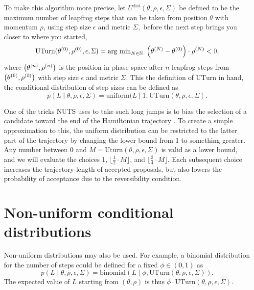 \documentclass[ejs]{imsart}
\theoremstyle{plain}%
\theoremstyle{remark}
\begin{document}
To make this algorithm more precise, let $U^{\textrm{dist}}(\theta, \rho, \epsilon, \Sigma)$ be defined to be the maximum number of leapfrog steps that can be taken from position $\theta$ with momentum $\rho$, using step size $\epsilon$ and metric $\Sigma,$ before the next step brings you closer to where you started,
\begin{equation}
\textrm{UTurn}(\pos{\theta}{0}, \pos{\rho}{0}, \epsilon, \Sigma)
= \textrm{arg min}_{N \in \mathbb{N}} \ \left(\pos{\theta}{N} - \pos{\theta}{0}\right) \cdot \pos{\rho}{N} < 0,
\end{equation}
where $\left(\theta^{(n)}, \rho^{(n)}\right)$ is the position in phase space after $n$ leapfrog steps from $\left(\theta^{(0)}, \rho^{(0)}\right)$ with step size $\epsilon$ and metric $\Sigma.$  This the definition of $\textrm{UTurn}$ in hand, the conditional distribution of step sizes can be defined as
\begin{equation}
p(L \mid \theta, \rho, \epsilon, \Sigma)
= \textrm{uniform}(L \mid 1, \textrm{UTurn}(\theta, \rho, \epsilon, \Sigma).
\end{equation}

One of the tricks NUTS uses to take such long jumps is to bias the selection of a candidate toward the end of the Hamiltonian trajectory \cite{HoGe2014}.  To create a simple approximation to this, the uniform distribution can be restricted to the latter part of the trajectory by changing the lower bound from 1 to something greater.  Any number between 0 and $M = \textrm{Uturn}(\theta, \rho, \epsilon, \Sigma)$ is valid as a lower bound, and we will evaluate the choices 1, $\lfloor \frac{1}{2} \cdot M \rfloor$, and $\lfloor \frac{3}{4} \cdot M \rfloor$.  Each subsequent choice increases the trajectory length of accepted proposals, but also lowers the probability of acceptance due to the reversibility condition.

\section{Non-uniform conditional distributions} \label{sec:nonuniform}

Non-uniform distributions may also be used.  For example, a binomial distribution for the number of steps could be defined for a fixed $\phi \in (0, 1)$ as 
\begin{equation}
    p(L \mid \theta, \rho, \epsilon, \Sigma)
    = \textrm{binomial}\!\left(L \mid \phi, \textrm{UTurn}(\theta, \rho, \epsilon, \Sigma)\right).
\end{equation}
The expected value of $L$ starting from $(\theta, \rho)$ is thus $\phi \cdot \textrm{UTurn}(\theta, \rho, \epsilon, \Sigma).$
\end{document}
